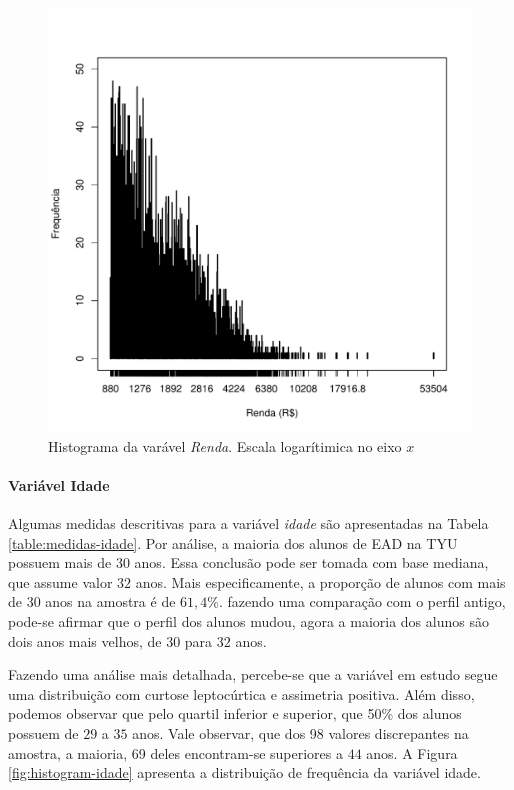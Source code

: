 \documentclass[10pt,a4paper,oneside]{article}
\begin{document}
\begin{figure}[!h]
	\includegraphics[width=\linewidth]{plots/histograma-renda}
	\caption{Histograma da varável \textit{Renda}. Escala logarítimica no eixo $x$}
	\label{fig:histograma-renda}
\end{figure}

%
%

\FloatBarrier

\paragraph{Variável Idade}

Algumas medidas descritivas para a variável \textit{idade} são apresentadas na Tabela \ref{table:medidas-idade}. Por análise, a maioria dos alunos de EAD na TYU possuem mais de 30 anos. Essa conclusão pode ser tomada com base mediana, que assume valor $32$ anos. Mais especificamente, a proporção de alunos com mais de 30 anos na amostra é de $61,4\%$. fazendo uma comparação com o perfil antigo, pode-se afirmar que o perfil dos alunos mudou, agora a maioria dos alunos são dois anos mais velhos, de $30$ para $32$ anos.

Fazendo uma análise mais detalhada, percebe-se que a variável em estudo segue uma distribuição com curtose leptocúrtica e assimetria positiva. Além disso, podemos observar que pelo quartil inferior e superior, que 50\%  dos alunos possuem de $29$ a $35$ anos. Vale observar, que dos 98 valores discrepantes na amostra, a maioria, 69 deles encontram-se superiores a $44$ anos. A Figura \ref{fig:histogram-idade} apresenta a distribuição de frequência da variável idade.
\end{document}
